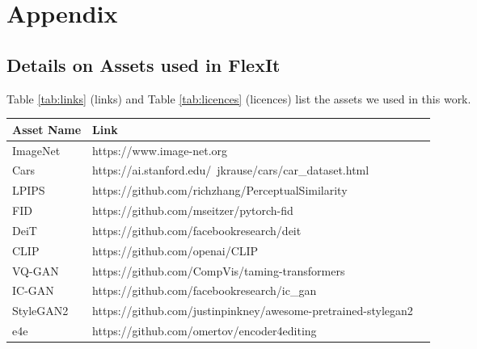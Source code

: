 \chapter{Appendix}
\label{chapter:appendix}

{}


\section{Details on Assets used in FlexIt}
\label{sec:FlexIt assets}



Table \ref{tab:links} (links) and Table \ref{tab:licences} (licences)
list the assets we used in this work.


\begin{table*}
\center
\begin{tabular}{lll}
\toprule
\textbf{Asset Name} & \textbf{Link} \\
\midrule
ImageNet & https://www.image-net.org \\
Cars & https://ai.stanford.edu/~jkrause/cars/car\_dataset.html \\
LPIPS & https://github.com/richzhang/PerceptualSimilarity \\
FID & https://github.com/mseitzer/pytorch-fid \\
DeiT & https://github.com/facebookresearch/deit \\
CLIP & https://github.com/openai/CLIP \\
VQ-GAN & https://github.com/CompVis/taming-transformers \\
IC-GAN & https://github.com/facebookresearch/ic\_gan \\
StyleGAN2 & https://github.com/justinpinkney/awesome-pretrained-stylegan2 \\
e4e & https://github.com/omertov/encoder4editing \\
\bottomrule
\end{tabular}
\caption{List of asset links.}
\label{tab:links}
\end{table*}

